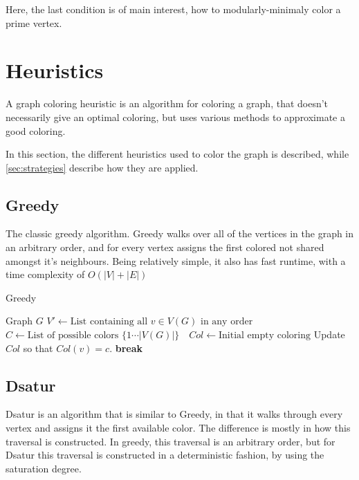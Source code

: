\documentclass{amsart}
\newcommand{\algorithmicbreak}{\textbf{break}}
\newcommand{\BREAK}{\STATE \algorithmicbreak}
\begin{document}
Here, the last condition is of main interest, how to modularly-minimaly 
color a prime vertex.

\section{Heuristics}
\label{sec:Heuristics}

A graph coloring heuristic is an algorithm for coloring a graph, that doesn't
necessarily give an optimal coloring, but uses various methods to approximate a
good coloring.


In this section, the different heuristics used to color the graph is described,
while \autoref{sec:strategies} describe how they are applied.
\subsection{Greedy}
The classic greedy algorithm. Greedy walks over all of the vertices in the graph
in an arbitrary order, and for every vertex assigns the first colored not shared
amongst it's neighbours. Being relatively simple, it also has fast runtime, with
a time complexity of $O(|V|+|E|)$ \cite{Constructive}

\begin{algorithm}[H]
  \caption{Greedy}
  \label{alg:greedy}
  \begin{algorithmic}[1]
    \REQUIRE Graph $G$
      \STATE $V' \leftarrow \text{List containing all $v \in V(G)$ in any order}$
      \STATE $C \leftarrow \text{List of possible colors $\{1 \cdots |V(G)| \}$ }$
      \STATE $Col \leftarrow \text{Initial empty coloring}$
                \STATE Update $Col$ so that $Col(v) = c$.
                \BREAK
            \ENDIF
        \ENDFOR
    \ENDFOR
  \end{algorithmic}
\end{algorithm}
\subsection{Dsatur}

Dsatur is an algorithm that is similar to Greedy, in that it walks through every
vertex and assigns it the first available color. The difference is mostly in
how this traversal is constructed. In greedy, this traversal is an arbitrary
order, but for Dsatur this traversal is constructed in a deterministic fashion,
by using the saturation degree.
\end{document}
